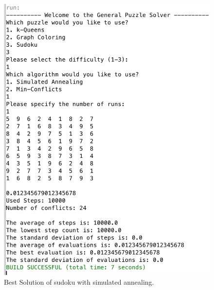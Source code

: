 \documentclass{scrartcl}
\begin{document}
 \begin{figure}[!htbp]
 \includegraphics[width=1.0\linewidth]{graphics/sudoku-sa.png}
\caption{Best Solution of sudoku with simulated annealing.}\label{fig:sudoku-sa}
 \end{figure}
 
\end{document}
